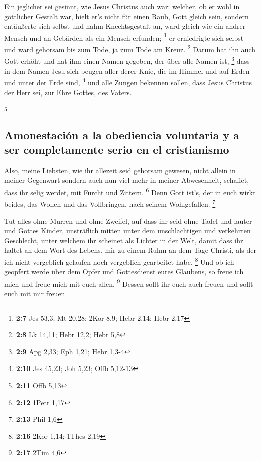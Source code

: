  Ein jeglicher sei gesinnt, wie Jesus Christus auch war:
 welcher, ob er wohl in göttlicher Gestalt war, hielt er's
nicht für einen Raub, Gott gleich sein,  sondern
entäußerte sich selbst und nahm Knechtsgestalt an, ward gleich wie ein
andrer Mensch und an Gebärden als ein Mensch erfunden; \footnote{\textbf{2:7}
  Jes 53,3; Mt 20,28; 2Kor 8,9; Hebr 2,14; Hebr 2,17}  er
erniedrigte sich selbst und ward gehorsam bis zum Tode, ja zum Tode am
Kreuz. \footnote{\textbf{2:8} Lk 14,11; Hebr 12,2; Hebr 5,8}
 Darum hat ihn auch Gott erhöht und hat ihm einen Namen
gegeben, der über alle Namen ist, \footnote{\textbf{2:9} Apg 2,33; Eph
  1,21; Hebr 1,3-4}  dass in dem Namen Jesu sich beugen
aller derer Knie, die im Himmel und auf Erden und unter der Erde sind,
\footnote{\textbf{2:10} Jes 45,23; Joh 5,23; Offb 5,12-13}
 und alle Zungen bekennen sollen, dass Jesus Christus der
Herr sei, zur Ehre Gottes, des Vaters.

\footnote{\textbf{2:11} Offb 5,13}

\hypertarget{amonestaciuxf3n-a-la-obediencia-voluntaria-y-a-ser-completamente-serio-en-el-cristianismo}{%
\subsection{Amonestación a la obediencia voluntaria y a ser
completamente serio en el
cristianismo}\label{amonestaciuxf3n-a-la-obediencia-voluntaria-y-a-ser-completamente-serio-en-el-cristianismo}}

 Also, meine Liebsten, wie ihr allezeit seid gehorsam
gewesen, nicht allein in meiner Gegenwart sondern auch nun viel mehr in
meiner Abwesenheit, schaffet, dass ihr selig werdet, mit Furcht und
Zittern. \footnote{\textbf{2:12} 1Petr 1,17}  Denn Gott
ist's, der in euch wirkt beides, das Wollen und das Vollbringen, nach
seinem Wohlgefallen. \footnote{\textbf{2:13} Phil 1,6}

 Tut alles ohne Murren und ohne Zweifel, 
auf dass ihr seid ohne Tadel und lauter und Gottes Kinder, unsträflich
mitten unter dem unschlachtigen und verkehrten Geschlecht, unter welchem
ihr scheinet als Lichter in der Welt,  damit dass ihr
haltet an dem Wort des Lebens, mir zu einem Ruhm an dem Tage Christi,
als der ich nicht vergeblich gelaufen noch vergeblich gearbeitet habe.
\footnote{\textbf{2:16} 2Kor 1,14; 1Thes 2,19}  Und ob
ich geopfert werde über dem Opfer und Gottesdienst eures Glaubens, so
freue ich mich und freue mich mit euch allen. \footnote{\textbf{2:17}
  2Tim 4,6}  Dessen sollt ihr euch auch freuen und sollt
euch mit mir freuen.

